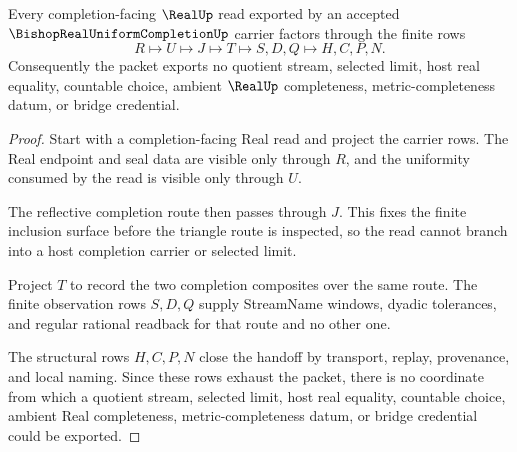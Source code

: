 \begin{theorem}
\label{thm:bishop-real-uniform-completion-l10-handoff}
Every completion-facing $\RealUp$ read exported by an accepted $\BishopRealUniformCompletionUp$ carrier factors through the finite rows
$$
R\longmapsto U\longmapsto J\longmapsto T\longmapsto S,D,Q\longmapsto H,C,P,N .
$$
Consequently the packet exports no quotient stream, selected limit, host real equality, countable choice, ambient $\RealUp$ completeness, metric-completeness datum, or bridge credential.
\end{theorem}
\begin{proof}
Start with a completion-facing Real read and project the carrier rows. The Real endpoint and seal data are visible only through $R$, and the uniformity consumed by the read is visible only through $U$.

The reflective completion route then passes through $J$. This fixes the finite inclusion surface before the triangle route is inspected, so the read cannot branch into a host completion carrier or selected limit.

Project $T$ to record the two completion composites over the same route. The finite observation rows $S,D,Q$ supply StreamName windows, dyadic tolerances, and regular rational readback for that route and no other one.

The structural rows $H,C,P,N$ close the handoff by transport, replay, provenance, and local naming. Since these rows exhaust the packet, there is no coordinate from which a quotient stream, selected limit, host real equality, countable choice, ambient Real completeness, metric-completeness datum, or bridge credential could be exported.
\end{proof}

